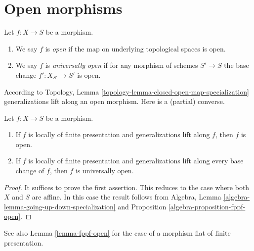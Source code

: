 











\section{Open morphisms}
\label{section-open}

\begin{definition}
\label{definition-open}
Let $f : X \to S$ be a morphism.
\begin{enumerate}
\item We say $f$ is {\it open} if the map on underlying
topological spaces is open.
\item We say $f$ is {\it universally open} if for any morphism of
schemes $S' \to S$ the base change $f' : X_{S'} \to S'$ is open.
\end{enumerate}
\end{definition}

\noindent
According to
Topology, Lemma \ref{topology-lemma-closed-open-map-specialization}
generalizations lift along an open morphism.
Here is a (partial) converse.

\begin{lemma}
\label{lemma-locally-finite-presentation-universally-open}
Let $f : X \to S$ be a morphism.
\begin{enumerate}
\item If $f$ is locally of finite presentation and generalizations lift
along $f$, then $f$ is open.
\item If $f$ is locally of finite presentation and generalizations lift
along every base change of $f$, then $f$ is universally open.
\end{enumerate}
\end{lemma}

\begin{proof}
It suffices to prove the first assertion.
This reduces to the case where both $X$ and $S$ are affine.
In this case the result follows from
Algebra, Lemma \ref{algebra-lemma-going-up-down-specialization}
and Proposition \ref{algebra-proposition-fppf-open}.
\end{proof}

\noindent
See also Lemma \ref{lemma-fppf-open} for the case of a morphism
flat of finite presentation.









